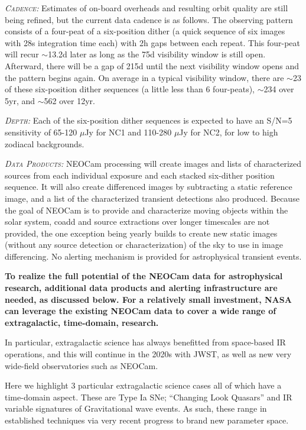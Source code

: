 \documentclass[12pt]{article}
\begin{document}
\smallskip
\smallskip
\noindent
\textsl{\textsc{Cadence:}} Estimates of on-board overheads and resulting orbit quality are still being refined, but the current data cadence is as follows. The observing pattern consists of a four-peat of a six-position dither (a quick sequence of six images with 28s integration time each) with 2h gaps between each repeat. This four-peat will recur $\sim$13.2d later as long as the 75d visibility window is still open. Afterward, there will be a gap of 215d until the next visibility window opens and the pattern begins again. On average in a typical visibility window, there are $\sim$23 of these six-position dither sequences (a little less than 6 four-peats), $\sim$234 over 5yr, and $\sim$562 over 12yr.

\smallskip
\smallskip
\noindent
\textsl{\textsc{Depth:}} Each of the six-position dither sequences is expected to have an S/N=5 sensitivity of 65-120 $\mu$Jy for NC1 and 110-280 $\mu$Jy for NC2, for low to high zodiacal backgrounds. 

\smallskip
\smallskip
\noindent
\textsl{\textsc{Data Products:}} NEOCam processing will create images and lists of characterized sources from each individual exposure and each stacked six-dither position sequence. It will also create differenced images by subtracting a static reference image, and a list of the characterized transient detections also produced. Because the goal of NEOCam is to provide and characterize moving objects within the solar system, coadd and source extractions over longer timescales are not provided, the one exception being yearly builds to create new static images (without any source detection or characterization) of the sky to use in image differencing. No alerting mechanism is provided for astrophysical transient events.  

\smallskip
\smallskip
\noindent
{\bf To realize the full potential of the NEOCam data for astrophysical research, additional data products and alerting infrastructure are needed, as discussed below. For a relatively small investment, NASA can leverage the existing NEOCam data to cover a wide range of extragalactic, time-domain, research.}


\smallskip
\smallskip
\noindent
In particular, extragalactic science has always benefitted from space-based IR operations, and this will continue in the 2020s with JWST, as well as new very wide-field observatories such as NEOCam. 


Here we highlight 3 particular extragalactic science cases all of which have a time-domain aspect. These are Type Ia SNe; ``Changing Look Quasars'' and IR variable signatures of Gravitational wave events. As such, these range in established techniques via very recent progress to brand new parameter space. 
\end{document}
